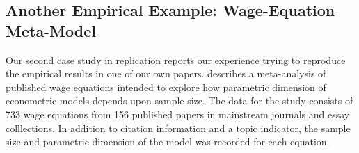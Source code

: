 \documentclass[10pt,a4paper,twoside]{article}
\begin{document}
\subsection{Another Empirical Example: Wage-Equation Meta-Model} \label{sec:wage}


Our second case study in replication reports our experience trying to reproduce
the empirical results in one of our own papers.  \cite{repro:Koenker:1988} describes
a meta-analysis of published wage equations intended to explore how parametric
dimension of econometric models depends upon sample size.  
The data for the study consists of 733 wage equations from  
156 published papers
in mainstream journals and essay colllections.  In addition to citation information
and a topic indicator, the sample size and parametric dimension of the model was
recorded for each equation.  
\end{document}

